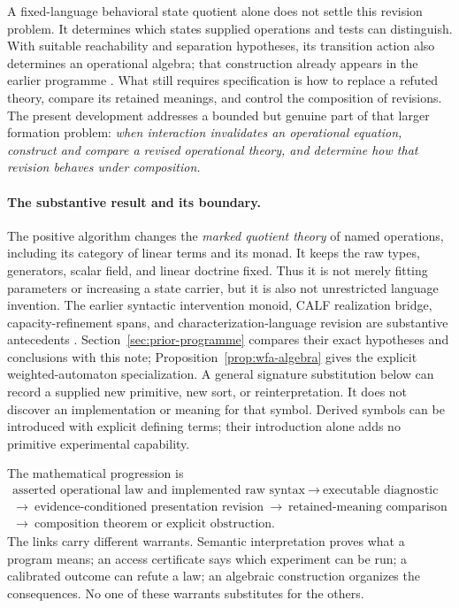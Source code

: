 \documentclass[11pt]{article}
\theoremstyle{definition}
\theoremstyle{remark}\newtheorem{remark}[theorem]{Remark}
\begin{document}
A fixed-language behavioral state quotient alone does not settle this
revision problem. It determines which states supplied operations and tests
can distinguish. With suitable reachability and separation hypotheses, its
transition action also determines an operational algebra; that construction
already appears in the earlier programme \cite{observation-note,bridge-note}.
What still requires specification is how to replace a refuted theory,
compare its retained meanings, and control the composition of revisions. The present development addresses a bounded but genuine
part of that larger formation problem: \emph{when interaction invalidates
an operational equation, construct and compare a revised operational theory,
and determine how that revision behaves under composition.}

\paragraph{The substantive result and its boundary.}
The positive algorithm changes the \emph{marked quotient theory} of named
operations, including its category of linear terms and its monad. It keeps
the raw types, generators, scalar field, and linear doctrine fixed. Thus it
is not merely fitting parameters or increasing a state carrier, but it is
also not unrestricted language invention. The earlier syntactic intervention
monoid, CALF realization bridge, capacity-refinement spans, and
characterization-language revision are substantive antecedents
\cite{observation-note,bridge-note,capacity-note,characterization-note}.
Section~\ref{sec:prior-programme} compares their exact hypotheses and
conclusions with this note; Proposition~\ref{prop:wfa-algebra} gives the
explicit weighted-automaton specialization. A general signature substitution
below can record a supplied new primitive, new sort, or reinterpretation.
It does not discover an implementation or meaning for that symbol. Derived
symbols can be introduced with explicit defining terms; their introduction
alone adds no primitive experimental capability.

The mathematical progression is
\[
\begin{gathered}
\text{asserted operational law and implemented raw syntax}
\ \longrightarrow\ \text{executable diagnostic}\\
\longrightarrow\ \text{evidence-conditioned presentation revision}
\ \longrightarrow\ \text{retained-meaning comparison}\\
\longrightarrow\ \text{composition theorem or explicit obstruction}.
\end{gathered}
\]
The links carry different warrants. Semantic interpretation proves what a
program means; an access certificate says which experiment can be run;
a calibrated outcome can refute a law; an algebraic construction organizes
the consequences. No one of these warrants substitutes for the others.
\end{document}
